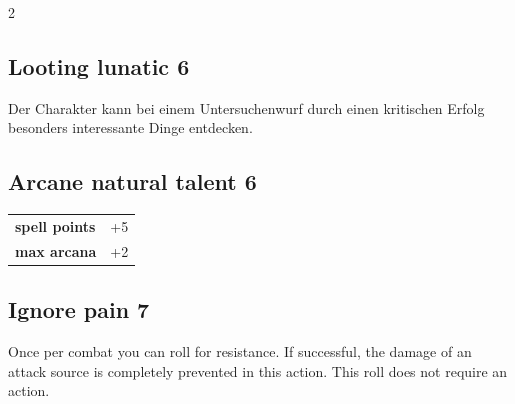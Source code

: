 \begin{multicols}{2}
\begin{tcolorbox}
\end{tcolorbox}

\begin{tcolorbox}
    \subsection*{Looting lunatic \hfill \small{6 }}
    \tcblower
Der Charakter kann bei einem Untersuchenwurf durch einen kritischen Erfolg besonders interessante  Dinge entdecken.


\vspace{3mm}



\end{tcolorbox}

\begin{tcolorbox}
    \subsection*{Arcane natural talent \hfill \small{6 }}
    \tcblower




\begin{tabular}{@{}ll@{}}
    \textbf{spell points} & +5\\
    \textbf{max arcana} & +2\\
\end{tabular}


\end{tcolorbox}

\begin{tcolorbox}
    \subsection*{Ignore pain \hfill \small{7 }}
    \tcblower
Once per combat you can roll for resistance. If successful, the damage of an attack source is completely prevented in this action. This roll does not require an action.


\vspace{3mm}




\end{tcolorbox}
\end{multicols}
